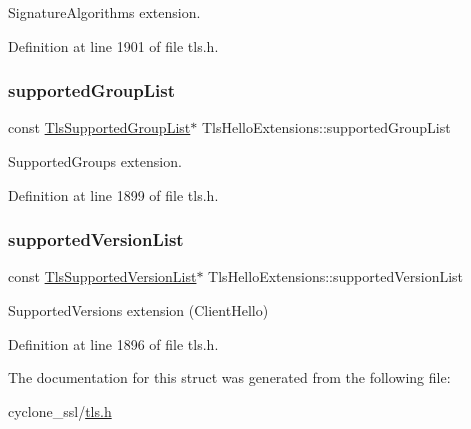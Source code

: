 Signature\+Algorithms extension. 



Definition at line 1901 of file tls.\+h.

\mbox{\label{structTlsHelloExtensions_ae47ac6a93d2836418dc163d299e46cf7}} 
\subsubsection{\texorpdfstring{supported\+Group\+List}{supportedGroupList}}
{\footnotesize\ttfamily const \hyperlink{tls_8h_a697f1e9ded788afc0e198e055676b13c}{Tls\+Supported\+Group\+List}$\ast$ Tls\+Hello\+Extensions\+::supported\+Group\+List}



Supported\+Groups extension. 



Definition at line 1899 of file tls.\+h.

\mbox{\label{structTlsHelloExtensions_ad2c1f8bd3e6432fe17b9ac339fc35a0b}} 
\subsubsection{\texorpdfstring{supported\+Version\+List}{supportedVersionList}}
{\footnotesize\ttfamily const \hyperlink{tls_8h_a47fa2b51d8550d068fce6f01a24c03a8}{Tls\+Supported\+Version\+List}$\ast$ Tls\+Hello\+Extensions\+::supported\+Version\+List}



Supported\+Versions extension (Client\+Hello) 



Definition at line 1896 of file tls.\+h.



The documentation for this struct was generated from the following file\+:\begin{DoxyCompactItemize}
\item 
cyclone\+\_\+ssl/\hyperlink{tls_8h}{tls.\+h}\end{DoxyCompactItemize}

